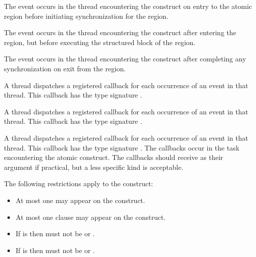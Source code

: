 \begin{samepage}

\events
The  event occurs in the thread encountering the
 construct on entry to the atomic region before
initiating synchronization for the region.

The  event occurs in the thread encountering the
 construct after entering the region, but before executing the
structured block of the  region.

The  event occurs in the thread encountering the
 construct after completing any synchronization
on exit from the  region.

\tools
A thread dispatches a registered 
callback for each occurrence of an  event
in that thread.
This callback has the type signature .

A thread dispatches a registered 
callback for each occurrence of an  event
in that thread.  This callback has the type signature .

A thread dispatches a registered 
callback for each occurrence of an  event
in that thread.  This callback has the type signature .
The callbacks occur in the task encountering
the atomic construct.  The callbacks should receive 
as their  argument if practical, but a less specific kind is acceptable.


\restrictions

The following restrictions apply to the  construct:

\begin{itemize}
\item At most one  may appear on the construct.

\item At most one  clause may appear on the construct.

\item If  is  then 
    must not be  or .

\item If  is  then 
    must not be  or .


\end{itemize}
\end{samepage}

